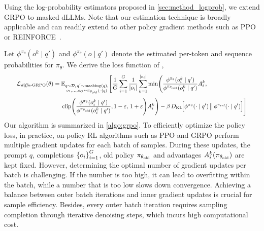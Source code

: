 Using the log-probability estimators proposed in \cref{sec:method_logprob}, we extend GRPO to masked dLLMs. Note that our estimation technique is broadly applicable and can readily extend to other policy gradient methods such as PPO~\citep{schulman2017proximal} or REINFORCE~\citep{williams1992simple}.

Let  $\phi^{\pi_\theta}(o^k \mid q')$ and $\phi^{\pi_\theta}(o \mid q')$  denote the estimated per-token and sequence probabilities for $\pi_\theta$. 
We derive the loss function of \grpo,
\begin{equation}
\resizebox{0.94\columnwidth}{!}{$%
\begin{aligned}
\mathcal{L}_{\text{\grpo{}}}(\theta)=\;&
\E_{\substack{q \sim \mathcal{D},\, q' \sim \text{masking}(q),\\
              o_1,\dots,o_G \sim \piold(\,\cdot \mid q)}}\Bigg[
\frac{1}{G}\sum_{i=1}^{G}\frac{1}{|o_i|}\sum_{k=1}^{|o_i|}
\min\!\Bigg(
      \frac{\phi^{\pi_\theta}(o^k_i \mid q')}
           {\phi^{\piold}(o^k_i \mid q')}A_i^{k},\\[4pt]
&\operatorname{clip}\!\Bigg(
        \frac{\phi^{\pi_\theta}(o^k_i \mid q')}
             {\phi^{\piold}(o^k_i \mid q')},
        1-\varepsilon,\,1+\varepsilon
  \Bigg)A_i^{k}
\Bigg)
-\beta\,D_{\text{KL}}\!\Bigl[
   \phi^{\pi_\theta}(\cdot \mid q')\,\bigl\|\,\phi^{\piref}(\cdot \mid q')
\Bigr]
\Bigg]
\end{aligned}$}%
\label{eq:diffugrpo}
\end{equation}
Our algorithm is summarized in \cref{algo:grpo}.
To efficiently optimize the policy loss, in practice, on-policy RL algorithms such as PPO and GRPO perform multiple gradient updates for each batch of samples. During these updates,  the prompt $q$, completions $\left\{o_i\right\}^G_{i=1}$, old policy $\pi_{\theta_{\text{old}}}$ and advantages $A^k_i(\pi_{\theta_{\text{old}}})$ are kept fixed. However, determining the optimal number of gradient updates per batch is challenging. If the number is too high, it can lead to overfitting within the batch, while a number that is too low slows down convergence. Achieving a balance between outer batch iterations and inner gradient updates is crucial for sample efficiency. Besides, every outer batch iteration requires sampling completion through iterative denoising steps, which incurs high computational cost.


